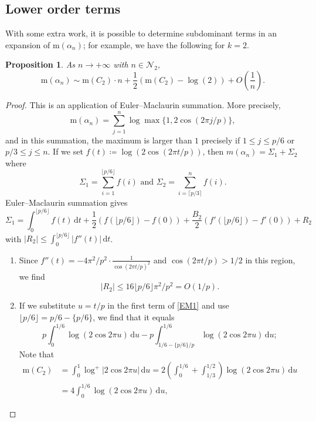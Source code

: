 \documentclass[12pt,reqno]{amsart}
\theoremstyle{definition}
\theoremstyle{plain}
\newtheorem{proposition}[theorem]{Proposition}
\theoremstyle{definition}
\newcommand\m{\mathrm{m}}
\newcommand\NN{{\mathcal N}}
\renewcommand{\leq}{\leqslant}
\renewcommand{\d}{\mathrm{d}}
\begin{document}
\subsection{Lower order terms} With some extra work, it is possible to determine subdominant terms in an expansion of $\m(\alpha_n)$; for example, we have the following for $k=2$. 

\begin{proposition} 
\label{LOT} 
As $n \rightarrow + \infty$ with $n \in \NN_2$, 
$$ \m(\alpha_n) \sim \m(C_2) \cdot n + \frac12(\m(C_2) - \log(2)) + O\left(\frac{1}{n}\right).$$
\end{proposition} 
  
  \begin{proof} This is an application of Euler--Maclaurin summation. More precisely, $$\m(\alpha_n) = \sum_{j=1}^n \log \max \{ 1, 2 \cos(2 \pi j/p) \},$$ and in this summation, the maximum is larger than $1$ precisely if $1 \leq j \leq p/6$  or $p/3 \leq j \leq n$. If we set $f(t)\coloneqq \log (2 \cos(2 \pi t/p))$, then $m(\alpha_n) = \Sigma_1 + \Sigma_2$ where 
  $$ \Sigma_1
 = \sum_{i=1}^{\lfloor p/6 \rfloor} f(i) \mbox{ and }   \Sigma_2
 = \sum_{i=\lceil p/3 \rceil}^n f(i). $$
 Euler--Maclaurin summation gives 
  \begin{equation} \label{EM1}  \Sigma_1 = \int_0^{\lfloor p/6 \rfloor} f(t) \, \d t  + \frac{1}{2} (f( \lfloor p/6 \rfloor) - f(0)) + \frac{B_2}{2}  (f'( \lfloor p/6 \rfloor) - f'(0)) + R_2 \end{equation} 
 with $|R_2| \leq  \int_0^{\lfloor p/6 \rfloor} |f''(t)| \, \d t$.
 \begin{enumerate} 
 \item Since $f''(t) = -4 \pi^2/p^2 \cdot \frac{1}{\cos(2 \pi t/p)^2}$ and  $\cos(2 \pi t/p)>1/2$ in this region, we find $$|R_2| \leq 16 \lfloor p/6 \rfloor \pi^2/p^2 = O(1/p).$$
\item If we substitute $u=t/p$ in the first term of \eqref{EM1} and use $\lfloor p/6 \rfloor = p/6-\{p/6\}$, we find that it equals 
 \begin{equation} \label{EM2} p \int_0^{1/6} \log(2 \cos 2 \pi u) \, \d u - p \int_{1/6-\{p/6\}/p}^{1/6}  \log(2 \cos 2 \pi u) \, \d u; \end{equation} 
 Note that 
 \begin{align*} 
 \m(C_2) & = \int_0^1 \log^+ |2 \cos 2\pi u| \, \d u = 2( \int_0^{1/6} + \int_{1/3}^{1/2}) \log (2 \cos 2\pi u) \, \d u \\ & = 4\int_0^{1/6} \log (2 \cos 2\pi u) \, \d u,
 \end{align*} 

\end{enumerate}
\end{proof}
\end{document}
